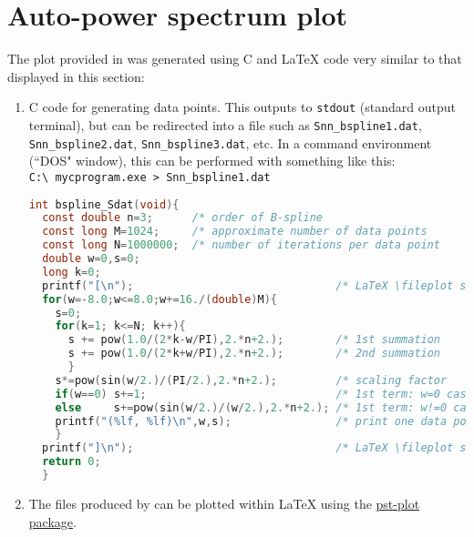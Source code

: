 \section{Auto-power spectrum plot}
\label{sec:src_Nriesz}
The plot provided in  was generated using C and {\LaTeX} code 
very similar to that displayed in this section:
\begin{enumerate}
  \item \label{item:src_Nriesz_C}
        C code for generating data points. This outputs to \lstinline[language=C]{stdout} 
        (standard output terminal), but can be redirected into a file such as \lstinline{Snn_bspline1.dat},
        \lstinline{Snn_bspline2.dat}, \lstinline{Snn_bspline3.dat}, etc.
        In a  command environment (``DOS" window), this can be performed with 
        something like this:
        \\\indentx\lstinline{C:\ mycprogram.exe > Snn_bspline1.dat}
\begin{lstlisting}[language=C]
int bspline_Sdat(void){
  const double n=3;      /* order of B-spline                             */
  const long M=1024;     /* approximate number of data points             */
  const long N=1000000;  /* number of iterations per data point           */
  double w=0,s=0;
  long k=0;
  printf("[\n");                               /* LaTeX \fileplot support */
  for(w=-8.0;w<=8.0;w+=16./(double)M){
    s=0;
    for(k=1; k<=N; k++){
      s += pow(1.0/(2*k-w/PI),2.*n+2.);        /* 1st summation           */
      s += pow(1.0/(2*k+w/PI),2.*n+2.);        /* 2nd summation           */
      }                                                                   
    s*=pow(sin(w/2.)/(PI/2.),2.*n+2.);         /* scaling factor          */
    if(w==0) s+=1;                             /* 1st term: w=0 case      */    
    else     s+=pow(sin(w/2.)/(w/2.),2.*n+2.); /* 1st term: w!=0 case     */
    printf("(%lf, %lf)\n",w,s);                /* print one data point    */
    }
  printf("]\n");                               /* LaTeX \fileplot support */
  return 0;
  }
\end{lstlisting}

  \item \label{item:src_Nriesz_pstplot} 
        The files produced by  can be plotted within {\LaTeX} 
        using the \href{http://www.ctan.org/pkg/pst-plot}{pst-plot package}.



\end{enumerate}
